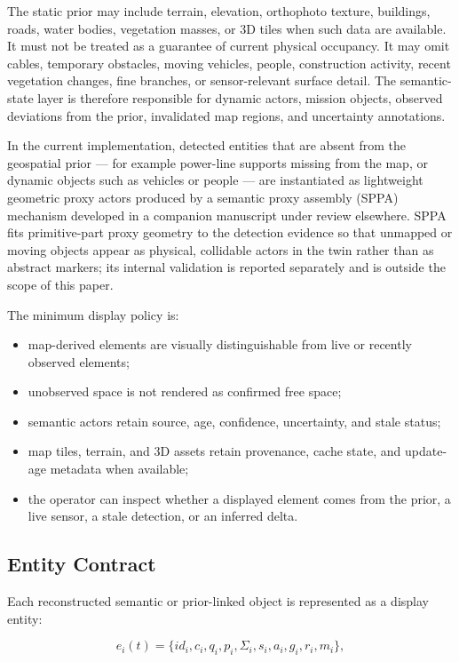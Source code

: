 \documentclass[fleqn]{VRIH2025}
\begin{document}
The static prior may include terrain, elevation, orthophoto texture, buildings, roads, water bodies, vegetation masses, or 3D tiles when such data are available. It must not be treated as a guarantee of current physical occupancy. It may omit cables, temporary obstacles, moving vehicles, people, construction activity, recent vegetation changes, fine branches, or sensor-relevant surface detail. The semantic-state layer is therefore responsible for dynamic actors, mission objects, observed deviations from the prior, invalidated map regions, and uncertainty annotations.

In the current implementation, detected entities that are absent from the geospatial prior --- for example power-line supports missing from the map, or dynamic objects such as vehicles or people --- are instantiated as lightweight geometric proxy actors produced by a semantic proxy assembly (SPPA) mechanism developed in a companion manuscript under review elsewhere. SPPA fits primitive-part proxy geometry to the detection evidence so that unmapped or moving objects appear as physical, collidable actors in the twin rather than as abstract markers; its internal validation is reported separately and is outside the scope of this paper.

The minimum display policy is:

\begin{itemize}
    \item map-derived elements are visually distinguishable from live or recently observed elements;
    \item unobserved space is not rendered as confirmed free space;
    \item semantic actors retain source, age, confidence, uncertainty, and stale status;
    \item map tiles, terrain, and 3D assets retain provenance, cache state, and update-age metadata when available;
    \item the operator can inspect whether a displayed element comes from the prior, a live sensor, a stale detection, or an inferred delta.
\end{itemize}

\subsection{Entity Contract}

Each reconstructed semantic or prior-linked object is represented as a display entity:

\begin{equation}
e_i(t) = \{ id_i, c_i, q_i, p_i, \Sigma_i, s_i, a_i, g_i, r_i, m_i \},
\label{eq:entity}
\end{equation}
\end{document}

